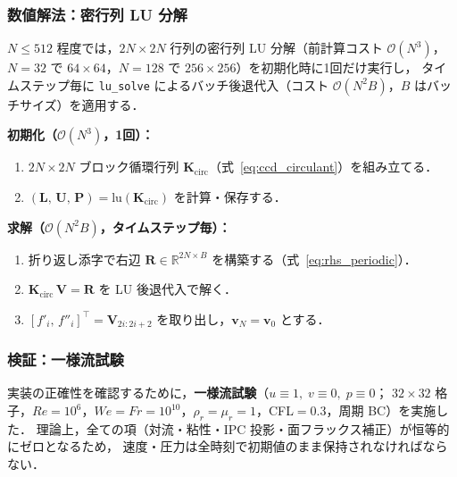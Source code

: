 \subsubsection{数値解法：密行列 LU 分解}

$N \leq 512$ 程度では，$2N\times 2N$ 行列の密行列 LU 分解（前計算コスト $\mathcal{O}(N^3)$，
$N=32$ で $64\times64$，$N=128$ で $256\times256$）を初期化時に1回だけ実行し，
タイムステップ毎に \texttt{lu\_solve} によるバッチ後退代入（コスト $\mathcal{O}(N^2 B)$，$B$ はバッチサイズ）を適用する．

\begin{tcolorbox}[algbox, title={周期 CCD 解法の手順（実装概要）}]
\textbf{初期化（$\mathcal{O}(N^3)$，1回）：}
\begin{enumerate}
  \item $2N\times 2N$ ブロック循環行列 $\mathbf{K}_{\mathrm{circ}}$（式~\eqref{eq:ccd_circulant}）を組み立てる．
  \item $(\mathbf{L},\,\mathbf{U},\,\mathbf{P}) = \mathrm{lu}(\mathbf{K}_{\mathrm{circ}})$ を計算・保存する．
\end{enumerate}
\textbf{求解（$\mathcal{O}(N^2 B)$，タイムステップ毎）：}
\begin{enumerate}
  \item 折り返し添字で右辺 $\mathbf{R} \in \mathbb{R}^{2N\times B}$ を構築する（式~\eqref{eq:rhs_periodic}）．
  \item $\mathbf{K}_{\mathrm{circ}}\,\mathbf{V} = \mathbf{R}$ を LU 後退代入で解く．
  \item $[f'_i,\, f''_i]^\top = \mathbf{V}_{2i:2i+2}$ を取り出し，$\bm{v}_N = \bm{v}_0$ とする．
\end{enumerate}
\end{tcolorbox}

\subsubsection{検証：一様流試験}
\label{sec:verify_uniform_flow}

実装の正確性を確認するために，\textbf{一様流試験}（$u\equiv1,\; v\equiv0,\; p\equiv0$；
$32\times32$ 格子，$Re=10^6$，$We=Fr=10^{10}$，$\rho_r=\mu_r=1$，CFL$=0.3$，周期 BC）を実施した．
理論上，全ての項（対流・粘性・IPC 投影・面フラックス補正）が恒等的にゼロとなるため，
速度・圧力は全時刻で初期値のまま保持されなければならない．

